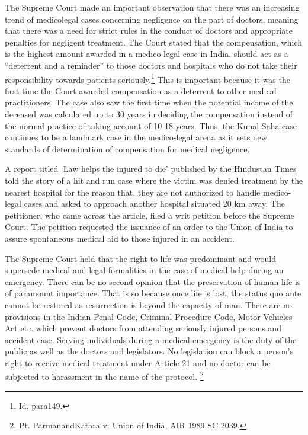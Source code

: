 \begin{multicols}{2}
\noi
The Supreme Court made an important observation that there was an increasing trend of medicolegal cases concerning negligence on the part of doctors, meaning that there was a need for strict
rules in the conduct of doctors and appropriate penalties for negligent treatment. The Court stated
that the compensation, which is the highest amount awarded in a medico-legal case in India,
should act as a “deterrent and a reminder” to those doctors and hospitals who do not take their responsibility towards patients seriously.\footnote{Id. para149.} This is important because it was the first time the Court
awarded compensation as a deterrent to other medical practitioners. The case also saw the first
time when the potential income of the deceased was calculated up to 30 years in deciding the
compensation instead of the normal practice of taking account of 10-18 years. Thus, the Kunal
Saha case continues to be a landmark case in the medico-legal arena as it sets new standards of
determination of compensation for medical negligence.


\noi
A report titled ‘Law helps the injured to die’ published by the Hindustan Times told the story of
a hit and run case where the victim was denied treatment by the nearest hospital for the reason
that, they are not authorized to handle medico-legal cases and asked to approach another hospital
situated 20 km away. The petitioner, who came across the article, filed a writ petition before the
Supreme Court. The petition requested the issuance of an order to the Union of India to assure
spontaneous medical aid to those injured in an accident.

\noi
The Supreme Court held that the right to life was predominant and would supersede medical and
legal formalities in the case of medical help during an emergency. There can be no second opinion
that the preservation of human life is of paramount importance. That is so because once life is
lost, the status quo ante cannot be restored as resurrection is beyond the capacity of man. There
are no provisions in the Indian Penal Code, Criminal Procedure Code, Motor Vehicles Act etc.
which prevent doctors from attending seriously injured persons and accident case. Serving
individuals during a medical emergency is the duty of the public as well as the doctors and
legislators. No legislation can block a person’s right to receive medical treatment under Article
21 and no doctor can be subjected to harassment in the name of the protocol. \footnote{Pt. ParmanandKatara v. Union of India, AIR 1989 SC 2039.}


\end{multicols}
